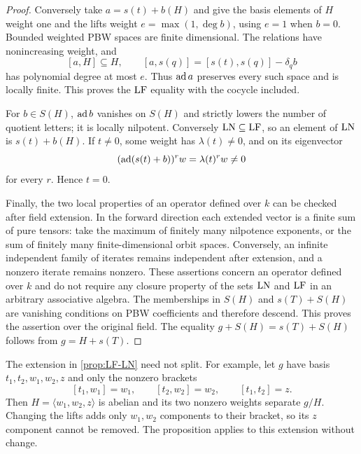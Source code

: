 \begin{proof}
Conversely take $a=s(t)+b(H)$ and give the basis elements of $H$
weight one and the lifts weight $e=\max(1,\deg b)$, using $e=1$
when $b=0$. Bounded weighted PBW spaces are finite dimensional.
The relations have nonincreasing weight, and
\[
 [a,H]\subseteq H,\qquad
 [a,s(q)]=[s(t),s(q)]-\delta_qb
\]
has polynomial degree at most $e$. Thus $\operatorname{ad} a$ preserves every
such space and is locally finite. This proves the $\operatorname{LF}$ equality
with the cocycle included.

For $b\in S(H)$, $\operatorname{ad} b$ vanishes on $S(H)$ and strictly lowers
the number of quotient letters; it is locally nilpotent. Conversely
$\operatorname{LN}\subseteq\operatorname{LF}$, so an element of $\operatorname{LN}$ is $s(t)+b(H)$. If
$t\ne0$, some weight has $\lambda(t)\ne0$, and on its eigenvector
\[
 (\operatorname{ad}(s(t)+b))^rw=\lambda(t)^rw\ne0
\]
for every $r$. Hence $t=0$.

Finally, the two local properties of an operator defined over $k$
can be checked after field extension. In the forward direction each
extended vector is a finite sum of pure tensors: take the maximum
of finitely many nilpotence exponents, or the sum of finitely many
finite-dimensional orbit spaces. Conversely, an infinite independent
family of iterates remains independent after extension, and a nonzero
iterate remains nonzero. These assertions concern an operator defined
over $k$ and do not require any closure property of the sets $\operatorname{LN}$
and $\operatorname{LF}$ in an arbitrary associative algebra.
The memberships in $S(H)$ and $s(T)+S(H)$ are vanishing conditions
on PBW coefficients and therefore descend. This proves the assertion
over the original field. The equality
$g+S(H)=s(T)+S(H)$ follows from
$g=H+s(T)$.
\end{proof}

\begin{remark}
The extension in \cref{prop:LF-LN} need not split. For example, let
$g$ have basis $t_1,t_2,w_1,w_2,z$ and only the nonzero
brackets
\[
 [t_1,w_1]=w_1,\qquad [t_2,w_2]=w_2,\qquad [t_1,t_2]=z.
\]
Then $H=\langle w_1,w_2,z\rangle$ is abelian and its two nonzero
weights separate $g/H$. Changing the lifts adds only
$w_1,w_2$ components to their bracket, so its $z$ component cannot
be removed. The proposition applies to this extension without change.
\end{remark}

